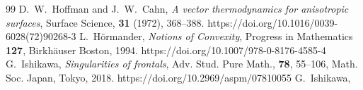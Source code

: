 \documentclass{amsart}
\theoremstyle{definition}
\theoremstyle{definition}
\theoremstyle{definition}
\begin{document}
{\begin{thebibliography}{99}
D.~W.~Hoffman and J.~W.~Cahn,
\emph{A vector thermodynamics for anisotropic surfaces},
Surface Science, {\bf 31} (1972), 368--388.
https://doi.org/10.1016/0039-6028(72)90268-3 
{\color{black}
L.~H\"{o}rmander,  
\emph{Notions of Convexity}, 
Progress in Mathematics {\bf 127}, 
Birkh\"{a}user Boston, 1994.       
https://doi.org/10.1007/978-0-8176-4585-4 
}
G.~Ishikawa,
\emph{Singularities of frontals},
Adv. Stud. Pure Math., {\bf 78},
55--106, Math. Soc. Japan, Tokyo, 2018.
https://doi.org/10.2969/aspm/07810055    
G.~Ishikawa, 

\end{thebibliography}}
\end{document}
